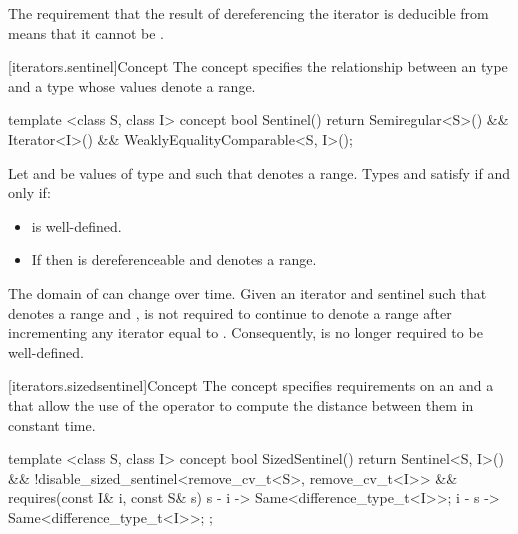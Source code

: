\pnum
\enternote The requirement that the result of dereferencing the iterator is deducible from
 means that it cannot be .\exitnote

[iterators.sentinel]{Concept }
\pnum
The  concept
specifies the relationship
between an  type and a  type whose values
denote a range.

%
\begin{itemdecl}
  template <class S, class I>
  concept bool Sentinel() {
    return Semiregular<S>() &&
      Iterator<I>() &&
      WeaklyEqualityComparable<S, I>();
  }
\end{itemdecl}

\begin{itemdescr}
\pnum
Let  and  be values of type  and
 such that  denotes a range. Types
 and  satisfy 
if and only if:

\begin{itemize}
\item {} is well-defined.

\item If  then  is dereferenceable and
       denotes a range.
\end{itemize}
\end{itemdescr}

\pnum
The domain of \tcode{==} can change over time.
Given an iterator  and sentinel  such that 
denotes a range and ,  is not required to continue to
denote a range after incrementing any iterator equal to . Consequently,
 is no longer required to be well-defined.

[iterators.sizedsentinel]{Concept }
\pnum
The  concept specifies
requirements on an  and a 
that allow the use of the \tcode{-} operator to compute the distance
between them in constant time.

%

\begin{itemdecl}
  template <class S, class I>
  concept bool SizedSentinel() {
    return Sentinel<S, I>() &&
      !disable_sized_sentinel<remove_cv_t<S>, remove_cv_t<I>> &&
      requires(const I& i, const S& s) {
        { s - i } -> Same<difference_type_t<I>>;
        { i - s } -> Same<difference_type_t<I>>;
      };
  }
\end{itemdecl}

